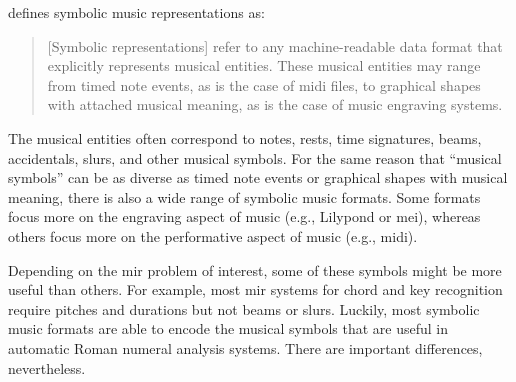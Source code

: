

\textcite{muller2015music} defines symbolic music
representations as:

\begin{quote}
[Symbolic representations] refer to any machine-readable
data format that explicitly represents musical entities.
These musical entities may range from timed note events, as
is the case of \gls{midi} ﬁles, to graphical shapes with attached
musical meaning, as is the case of music engraving systems.
\end{quote}


The musical entities often correspond to notes, rests, time
signatures, beams, accidentals, slurs, and other musical
symbols. For the same reason that ``musical symbols'' can be
as diverse as timed note events or graphical shapes with
musical meaning, there is also a wide range of symbolic
music formats. Some formats focus more on the engraving
aspect of music (e.g., Lilypond or \gls{mei}), whereas others
focus more on the performative aspect of music (e.g., \gls{midi}).

Depending on the \gls{mir} problem of interest, some of these
symbols might be more useful than others. For example, most
\gls{mir} systems for chord and key recognition require pitches
and durations but not beams or slurs. Luckily, most symbolic
music formats are able to encode the musical symbols that
are useful in automatic Roman numeral analysis systems.
There are important differences, nevertheless.
